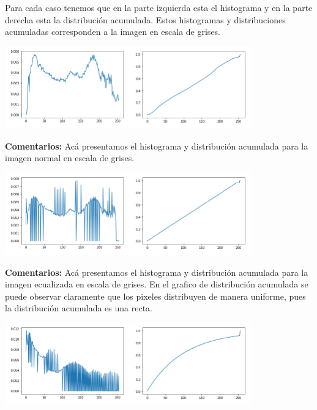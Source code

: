 \documentclass[11pt]{article}
\begin{document}
Para cada caso tenemos que en la parte izquierda esta el histograma y en la parte derecha esta la distribución acumulada. Estos histogramas y distribuciones acumuladas corresponden a la imagen en escala de grises. \\


\begin{center}
\includegraphics[width=0.8\textwidth]{./figures/grafico_beto_normal}
\end{center}

\textbf{Comentarios:} Acá presentamos el histograma y distribución acumulada para la imagen normal en escala de grises. \\

\begin{center}
\includegraphics[width=0.8\textwidth]{./figures/grafico_beto_ecualizado}
\end{center}

\textbf{Comentarios:} Acá presentamos el histograma y distribución acumulada para la imagen ecualizada en escala de grises. En el grafico de distribución acumulada se puede observar claramente que los pixeles distribuyen de manera uniforme, pues la distribución acumulada es una recta. \\

\begin{center}
\includegraphics[width=0.8\textwidth]{./figures/grafico_beto_exponencial}
\end{center}
\end{document}
